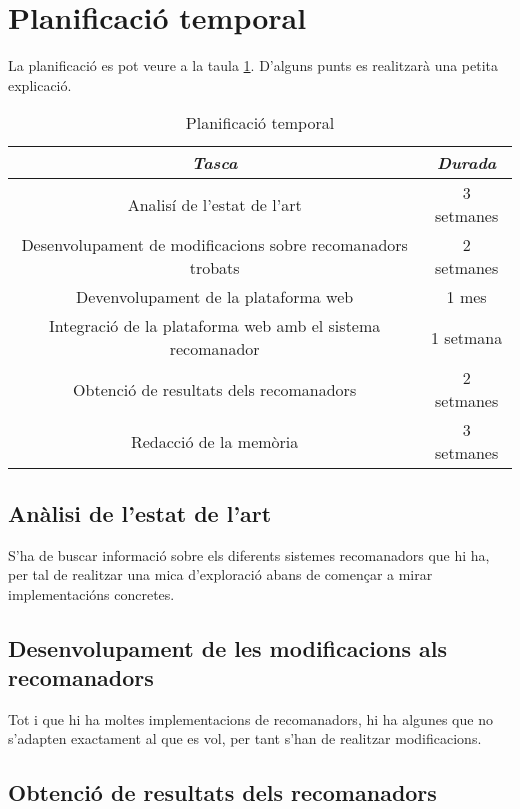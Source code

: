 \section{Planificació temporal}

La planificació es pot veure a la taula \ref{table-planing}. D'alguns punts es realitzarà una petita explicació.

\begin{table}[h!]
  \caption{Planificació temporal}
  \label{table-planing}
\begin{tabular}{|c|c|}
	\hline
	\emph{Tasca} & \emph{Durada} \\ \hline
	Analisí de l'estat de l'art & 3 setmanes  \\ \hline
	Desenvolupament de modificacions sobre recomanadors trobats & 2 setmanes  \\ \hline
	Devenvolupament de la plataforma web & 1 mes  \\ \hline
	Integració de la plataforma web amb el sistema recomanador & 1 setmana  \\ \hline
	Obtenció de resultats dels recomanadors & 2 setmanes  \\ \hline
	Redacció de la memòria & 3 setmanes \\
	\hline
\end{tabular}
\end{table}

\subsection{Anàlisi de l'estat de l'art}

S'ha de buscar informació sobre els diferents sistemes recomanadors que hi ha, per tal de realitzar una mica d'exploració abans de començar a mirar implementacións concretes.

\subsection{Desenvolupament de les modificacions als recomanadors}

Tot i que hi ha moltes implementacions de recomanadors, hi ha algunes que no s'adapten exactament al que es vol, per tant s'han de realitzar modificacions.

\subsection{Obtenció de resultats dels recomanadors}

